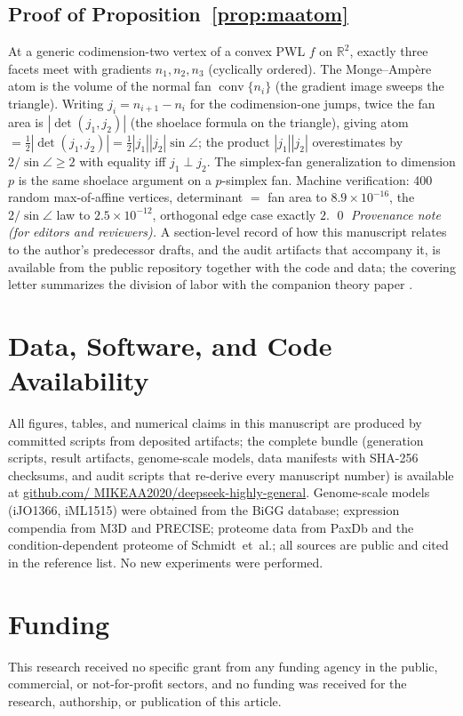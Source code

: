 \documentclass[11pt,a4paper]{article}
\theoremstyle{plain}
\theoremstyle{definition}
\theoremstyle{remark}
\newcommand{\RR}{\mathbb{R}}
\begin{document}
\subsection{Proof of Proposition~\ref{prop:maatom}}

At a generic codimension-two vertex of a convex PWL $f$ on
$\RR^2$, exactly three facets meet with gradients $n_1, n_2, n_3$
(cyclically ordered). The Monge--Amp\`ere atom is the volume of
the normal fan $\operatorname{conv}\{n_i\}$ (the gradient image
sweeps the triangle). Writing $j_i = n_{i+1} - n_i$ for the
codimension-one jumps, twice the fan area is $|\det(j_1, j_2)|$
(the shoelace formula on the triangle), giving atom $=
\tfrac12|\det(j_1, j_2)| = \tfrac12 |j_1||j_2| \sin\angle$; the
product $|j_1||j_2|$ overestimates by $2/\sin\angle \ge 2$ with
equality iff $j_1 \perp j_2$. The simplex-fan generalization to
dimension $p$ is the same shoelace argument on a $p$-simplex fan.
Machine verification: 400 random max-of-affine vertices,
determinant $=$ fan area to $8.9 \times 10^{-16}$, the
$2/\sin\angle$ law to $2.5 \times 10^{-12}$, orthogonal edge case
exactly $2$. \qed
\vspace{0.6em}
\noindent\emph{Provenance note (for editors and reviewers).} A
section-level record of how this manuscript relates to the author's
predecessor drafts, and the audit artifacts that accompany it, is
available from the public repository together with the code and
data; the covering letter summarizes the division of labor with the
companion theory paper \citep{zai2026categorical}.

\section*{Data, Software, and Code Availability}
All figures, tables, and numerical claims in this manuscript are
produced by committed scripts from deposited artifacts; the complete
bundle (generation scripts, result artifacts, genome-scale models,
data manifests with SHA-256 checksums, and audit scripts that
re-derive every manuscript number) is available at
\href{https://github.com/MIKEAA2020/deepseek-highly-general}{github.com/
MIKEAA2020/deepseek-highly-general}. Genome-scale models
(iJO1366, iML1515) were obtained from the BiGG database; expression
compendia from M3D and PRECISE; proteome data from PaxDb and the
condition-dependent proteome of Schmidt~et~al.; all sources are
public and cited in the reference list. No new experiments were
performed.

\section*{Funding}
This research received no specific grant from any funding agency in
the public, commercial, or not-for-profit sectors, and no funding
was received for the research, authorship, or publication of this
article.
\end{document}
